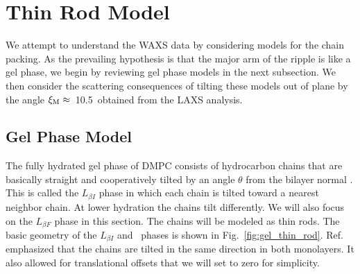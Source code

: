\newpage
\section{Thin Rod Model}\label{sec:thin_rod_model}
We attempt to understand the WAXS data by considering models for the chain 
packing.  As the prevailing hypothesis is that the major arm of the ripple is 
like a gel phase, we begin by reviewing gel phase models in the next subsection.  
We then consider the scattering consequences of tilting these models out of 
plane by the angle $\xi_\text{M}\approx$~10.5\textdegree\ obtained from the LAXS analysis.

\subsection{Gel Phase Model}\label{sec:gel_model}
The fully hydrated gel phase of DMPC consists of hydrocarbon chains that are 
basically straight and cooperatively tilted by an angle $\theta$ from the 
bilayer normal \cite{ref:Smith88,ref:Tristram93,ref:Sun94,Tristram-Nagle02}. 
This is called the $L_{{\beta}I}$ phase in which each chain is tilted toward 
a nearest neighbor chain. At lower hydration the chains tilt differently. 
We will also focus on the $L_{{\beta}F}$ phase in this section.  The chains 
will be modeled as thin rods.  The basic geometry of the $L_{{\beta}I}$ 
and \LbetaF\ phases
is shown in Fig.~\ref{fig:gel_thin_rod}.  
Ref.~\cite{ref:Sun94} emphasized that the chains 
are tilted in the same direction in both monolayers. It also allowed for 
translational offsets that we will set to zero for simplicity.  

